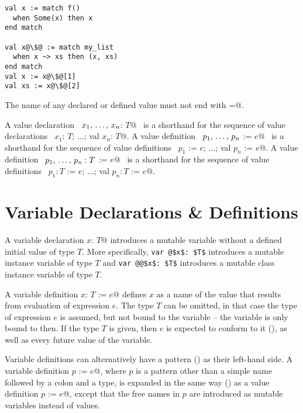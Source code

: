 \begin{lstlisting}[escapechar=@]
val x := match f()
  when Some(x) then x
end match

val x@\$@ := match my_list
  when x ~> xs then (x, xs)
end match
val x := x@\$@[1]
val xs := x@\$@[2]
\end{lstlisting}

The name of any declared or defined value must not end with \lstinline@=@. 

A value declaration ~\lstinline@val $x_1 ,\, \ldots ,\, x_n$: $T$@~ is a shorthand for the sequence of value declarations ~\lstinline@val $x_1$: $T$; $\ldots$; val $x_n$: $T$@. A value definition ~\lstinline@val $p_1 ,\, \ldots ,\, p_n$ := $e$@~ is a shorthand for the sequence of value definitions ~\lstinline@val $p_1$ := $e$; $\ldots$; val $p_n$ := $e$@. A value definition ~\lstinline@val $p_1 ,\, \ldots ,\, p_n: T$ := $e$@~ is a shorthand for the sequence of value definitions ~\lstinline@val $p_1: T$ := $e$; $\ldots$; val $p_n: T$ := $e$@.

\section{Variable Declarations \& Definitions}
\label{sec:variable-dcl-def}

A variable declaration \lstinline@var $x$: $T$@ introduces a mutable variable without a defined initial value of type $T$. More specifically, \lstinline+var @$x$: $T$+ introduces a mutable instance variable of type $T$ and \lstinline+var @@$x$: $T$+ introduces a mutable class instance variable of type $T$. 

A variable definition \lstinline@val $x$: $T$ := $e$@ defines $x$ as a name of the value that results from evaluation of expression $e$. The type $T$ can be omitted, in that case the type of expression $e$ is assumed, but not bound to the variable -- the variable is only bound to  then. If the type $T$ is given, then $e$ is expected to conform to it (), as well as every future value of the variable. 

Variable definitions can alternatively have a pattern () as their left-hand side. A variable definition \lstinline@var $p$ := $e$@, where $p$ is a pattern other than a simple name followed by a colon and a type, is expanded in the same way () as a value definition \lstinline@val $p$ := $e$@, except that the free names in $p$ are introduced as mutable variables instead of values. 

